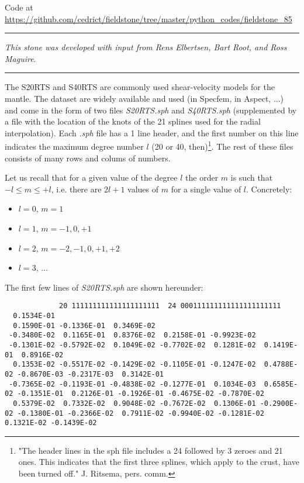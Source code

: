 
\begin{center}
Code at \url{https://github.com/cedrict/fieldstone/tree/master/python_codes/fieldstone_85}
\end{center}

\par\noindent\rule{\textwidth}{0.4pt}

{\sl This stone was developed with input from Rens Elbertsen, Bart Root, and Ross Maguire}. 

\par\noindent\rule{\textwidth}{0.4pt}

\vspace{1cm}



The S20RTS \cite{rivw99} and S40RTS \cite{ridv11} are commonly used shear-velocity models for the mantle.
The dataset are widely available and used (in Specfem, in Aspect, ...) and come in the form of two 
files {\sl S20RTS.sph} and {\sl S40RTS.sph} (supplemented by a file with the location of the 
knots of the 21 splines used for the radial interpolation). 
Each {\sl .sph} file has a 1 line header, and the first number on this line indicates 
the maximum degree number $l$ (20 or 40, then)\footnote{
"The header lines in the sph file includes a 24 followed by 3 zeroes and 21 ones. 
This indicates that the first three splines, which apply to the crust, have been turned off."
J. Ritsema, pers. comm.}. The rest of these files consists of many rows and colums of numbers.

Let us recall that for a given value of the degree $l$ the order $m$ is such that $-l \le m \le +l$, i.e. 
there are $2l+1$ values of $m$ for a single value of $l$. Concretely:
\begin{itemize}
\item $l=0$, $m=1$ 
\item $l=1$, $m=-1,0,+1$ 
\item $l=2$, $m=-2,-1,0,+1,+2$ 
\item $l=3$, ...
\end{itemize}
The first few lines of {\sl S20RTS.sph} are shown hereunder:
\begin{tiny}
\begin{verbatim}
             20 111111111111111111111  24 000111111111111111111111 
  0.1534E-01
  0.1590E-01 -0.1336E-01  0.3469E-02
 -0.3480E-02  0.1165E-01  0.8376E-02  0.2158E-01 -0.9923E-02
 -0.1301E-02 -0.5792E-02  0.1049E-02 -0.7702E-02  0.1281E-02  0.1419E-01  0.8916E-02
  0.1353E-02 -0.5517E-02 -0.1429E-02 -0.1105E-01 -0.1247E-02  0.4788E-02 -0.8670E-03 -0.2317E-03  0.3142E-01
 -0.7365E-02 -0.1193E-01 -0.4838E-02 -0.1277E-01  0.1034E-03  0.6585E-02 -0.1351E-01  0.2126E-01 -0.1926E-01 -0.4675E-02 -0.7870E-02
  0.5379E-02  0.7332E-02  0.9048E-02 -0.7672E-02  0.1306E-01 -0.2900E-02 -0.1380E-01 -0.2366E-02  0.7911E-02 -0.9940E-02 -0.1281E-02  0.1321E-02 -0.1439E-02
\end{verbatim}
\end{tiny}


